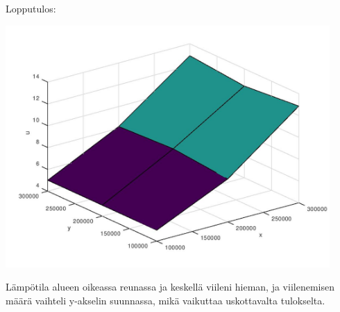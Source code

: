 \documentclass{article}
\begin{document}


Lopputulos:

\includegraphics[width=350pt]{w4_5.jpg}

Lämpötila alueen oikeassa reunassa ja keskellä viileni hieman, ja viilenemisen
määrä vaihteli y-akselin suunnassa, mikä vaikuttaa uskottavalta tulokselta.
\end{document}
